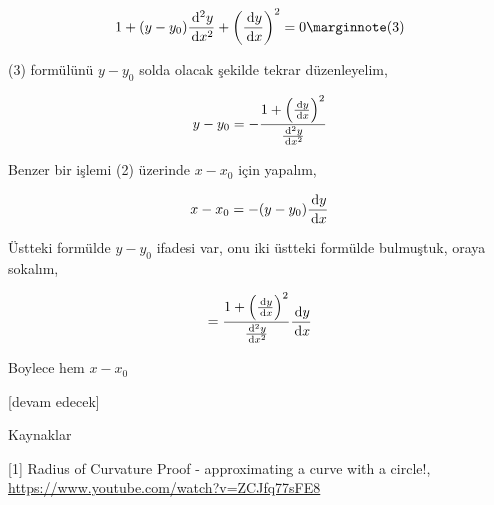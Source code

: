 \documentclass[12pt,fleqn]{article}\usepackage{../../common}
\begin{document}
$$
1 + (y-y_0) \frac{\ud^2y}{\ud x^2} +
\left( \frac{\ud y}{\ud x}  \right)^2 = 0
\mlabel{3}
$$

(3) formülünü $y-y_0$ solda olacak şekilde tekrar düzenleyelim,

$$
y-y_0 = - \frac{1 + \left( \frac{\,\mathrm{d} y}{\,\mathrm{d} x}  \right)^2}{\frac{\,\mathrm{d}^2y}{\,\mathrm{d} x^2}}
$$

Benzer bir işlemi (2) üzerinde $x-x_0$ için yapalım,

$$
x-x_0 = -(y-y_0)\frac{\,\mathrm{d} y}{\,\mathrm{d} x}
$$

Üstteki formülde $y-y_0$ ifadesi var, onu iki üstteki formülde bulmuştuk,
oraya sokalım,

$$
= \frac{1 + \left( \frac{\,\mathrm{d} y}{\,\mathrm{d} x}  \right)^2}{\frac{\,\mathrm{d}^2y}{\,\mathrm{d} x^2}}
\frac{\,\mathrm{d} y}{\,\mathrm{d} x}
$$

Boylece hem $x-x_0$ 


[devam edecek]

Kaynaklar

[1] Radius of Curvature Proof - approximating a curve with a circle!,
    \url{https://www.youtube.com/watch?v=ZCJfq77sFE8}
\end{document}
